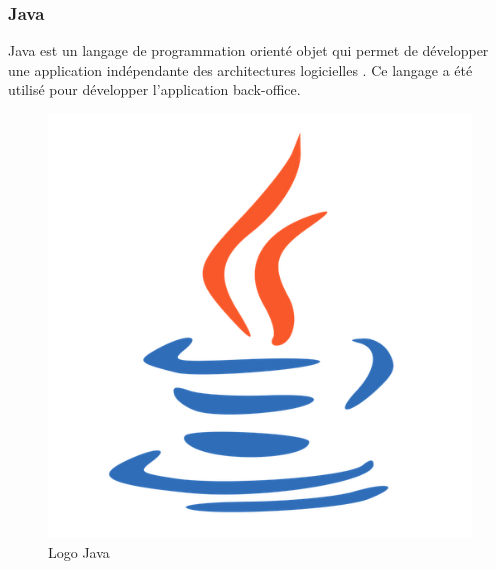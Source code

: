 \subsubsection{Java}
\noindent\begin{minipage}{0.69\textwidth}
Java est un langage de programmation orienté objet qui permet de développer une application indépendante des architectures logicielles \cite{Java}. Ce langage a été utilisé pour développer l'application back-office.
\end{minipage}
\begin{minipage}{0.3\textwidth}
\begin{figure}[H]
  \centering
  \includegraphics[scale=0.15]{figures/logo/java.png}
  \caption{Logo Java}
  \label{code43}
\end{figure}
\end{minipage}
